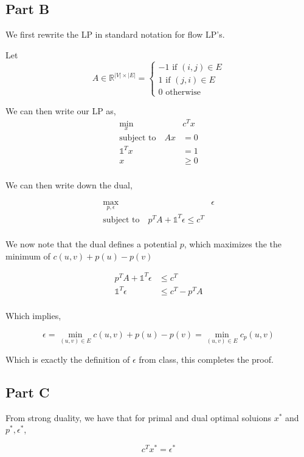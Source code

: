 \documentclass[a4paper]{article}
\begin{document}
\subsection{Part B}
We first rewrite the LP in standard notation for flow LP's.

Let 
$$
A \in \mathds{R}^{|V| \times |E|} = \begin{cases} -1 \text{ if } (i,j) \in E\\ 1 \text{ if } (j,i) \in E\\ 0 \text{ otherwise}\end{cases}
$$

We can then write our LP as, 
\begin{align*}
	\min_x \quad &c^Tx\\
	\text{subject to} \quad Ax &= 0\\
		   \mathds{1}^Tx &= 1\\
						x &\geq 0\\
\end{align*}

We can then write down the dual,

\begin{align*}
	\max_{p, \epsilon} \quad &\epsilon\\
	\text{subject to} \quad p^TA + \mathds{1}^T\epsilon \leq c^T\\
\end{align*}


We now note that the dual defines a potential $p$, which maximizes 
the the minimum of $c(u,v) + p(u) - p(v)$ 

\begin{align*}
	p^TA + \mathds{1}^T \epsilon &\leq c^T\\
	\mathds{1}^T \epsilon &\leq c^T - p^TA\\
\end{align*}

Which implies, 

$$
\epsilon = \min_{(u,v) \in E} c(u,v) + p(u) - p(v) = \min_{(u,v) \in E} c_p(u,v)
$$

Which is exactly the definition of $\epsilon$ from class,
this completes the proof.


\subsection{Part C}
From strong duality, we have that for primal and dual optimal soluions $x^*$ and $p^*, \epsilon^*$,

$$
c^Tx^* = \epsilon^*
$$
\end{document}
